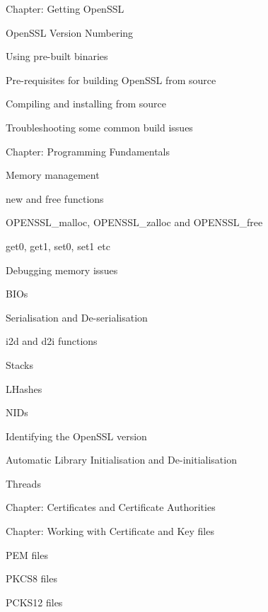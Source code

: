 \documentclass[oneside]{book}
\begin{document}
\begin{outline}
\begin{outline}
    \item{Chapter: Getting OpenSSL}
    \begin{outline}
      \item{OpenSSL Version Numbering}
      \item{Using pre-built binaries}
      \item{Pre-requisites for building OpenSSL from source}
      \item{Compiling and installing from source}
      \item{Troubleshooting some common build issues}
    \end{outline}
    \item{Chapter: Programming Fundamentals}
    \begin{outline}
      \item{Memory management}
      \begin{outline}
        \item{new and free functions}
        \item{OPENSSL\_malloc, OPENSSL\_zalloc and OPENSSL\_free}
        \item{get0, get1, set0, set1 etc}
        \item{Debugging memory issues}
      \end{outline}
      \item{BIOs}
      \item{Serialisation and De-serialisation}
      \begin{outline}
        \item{i2d and d2i functions}
      \end{outline}
      \item{Stacks}
      \item{LHashes}
      \item{NIDs}
      \item{Identifying the OpenSSL version}
      \item{Automatic Library Initialisation and De-initialisation}
      \item{Threads}
    \end{outline}
    \item{Chapter: Certificates and Certificate Authorities}
    \item{Chapter: Working with Certificate and Key files}
    \begin{outline}
      \item{PEM files}
      \item{PKCS8 files}
      \item{PCKS12 files}

\end{outline}
\end{outline}
\end{outline}
\end{document}
